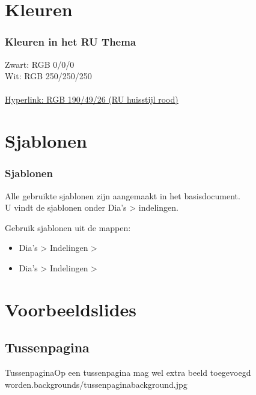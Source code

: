 \documentclass[department=softwarescience, notes={show notes}, slidesperpage=4, handout, official=true]{beamerruhuisstijl}
\begin{document}
\section{Kleuren}
\begin{frame}
    \frametitle{Kleuren in het RU Thema}

    Zwart: RGB 0/0/0 \\
    Wit: RGB 250/250/250 \\
     \\
    \href{http://google.com/}{Hyperlink: RGB 190/49/26 (RU huisstijl rood)}
\end{frame}
\note{}

\section{Sjablonen}
\begin{frame}
    \frametitle{Sjablonen}
    
    \begin{block}{}
        Alle gebruikte sjablonen zijn aangemaakt in het basisdocument. \\
        U vindt de sjablonen onder Dia's > indelingen.
    \end{block}

    \begin{block}{}
        Gebruik sjablonen uit de mappen:
        \begin{itemize}
            \item Dia's > Indelingen > 
            \item Dia's > Indelingen > 
        \end{itemize}
    \end{block}


\end{frame}


\section{Voorbeeldslides}
\subsection{Tussenpagina}
\begin{tussenpagina}{Tussenpagina}{Op een tussenpagina mag wel extra beeld toegevoegd worden.}{backgrounds/tussenpaginabackground.jpg}
\end{tussenpagina}
\note{
}
\end{document}
